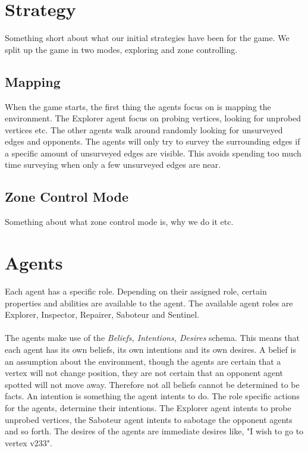 \documentclass[11pt]{article}
\begin{document}
\section{Strategy}
Something short about what our initial strategies have been for the game. We split up the game in two modes, exploring and zone controlling.

\subsection{Mapping}
When the game starts, the first thing the agents focus on is mapping the environment. The Explorer agent focus on probing vertices, looking for unprobed vertices etc. The other agents walk around randomly looking for unsurveyed edges and opponents. The agents will only try to survey the surrounding edges if a specific amount of unsurveyed edges are visible. This avoids spending too much time surveying when only a few unsurveyed edges are near.

\subsection{Zone Control Mode}
Something about what zone control mode is, why we do it etc.

\section{Agents}
Each agent has a specific role. Depending on their assigned role, certain properties and abilities are available to the agent. The available agent roles are Explorer, Inspector, Repairer, Saboteur and Sentinel.\\
\\
The agents make use of the \emph{Beliefs, Intentions, Desires} schema. This means that each agent has its own beliefs, its own intentions and its own desires. A belief is an assumption about the environment, though the agents are certain that a vertex will not change position, they are not certain that an opponent agent spotted will not move away. Therefore not all beliefs cannot be determined to be facts. An intention is something the agent intents to do. The role specific actions for the agents, determine their intentions. The Explorer agent intents to probe unprobed vertices, the Saboteur agent intents to sabotage the opponent agents and so forth. The desires of the agents are immediate desires like, "I wish to go to vertex v233".
\end{document}
